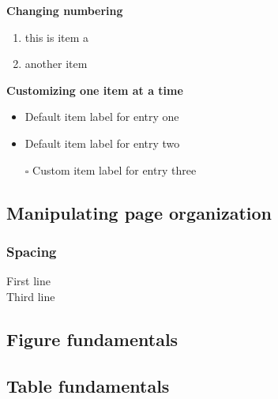 \documentclass[../main/main.tex]{subfiles}
\begin{document}
\noindent \textbf{Changing numbering}
\begin{enumerate}
\item this is item a
\setcounter{enumi}{5}
\item another item
\end{enumerate}

\noindent \textbf{Customizing one item at a time}
\begin{itemize}
\item  Default item label for entry one
\item  Default item label for entry two
\item[$\square$]  Custom item label for entry three
\end{itemize}

\subsection*{Manipulating page organization}
\subsubsection*{Spacing}
First line\\ \vspace{\baselineskip}
Third line

\subsection*{Figure fundamentals}

\subsection*{Table fundamentals}
\end{document}
